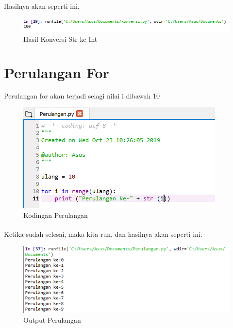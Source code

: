 \documentclass{article}
\begin{document}
\paragraph{}
Hasilnya akan seperti ini.
\begin{figure}[!htbp]
    \centering
    \includegraphics[scale=0.6]{HasilKonvStrKeInt.PNG}
    \caption{Hasil Konversi Str ke Int}
\end{figure}
\newpage
\section{Perulangan For}
Perulangan for akan terjadi selagi nilai i dibawah 10
\begin{figure}[!htbp]
    \centering
    \includegraphics{Perulangan.PNG}
    \caption{Kodingan Perulangan}
\end{figure}
\paragraph{}
Ketika sudah selesai, maka kita run, dan hasilnya akan seperti ini.
\begin{figure}[!htbp]
    \centering
    \includegraphics[scale=0.6]{OutputPerulangan.PNG}
    \caption{Output Perulangan}
\end{figure}
\newpage
\end{document}
